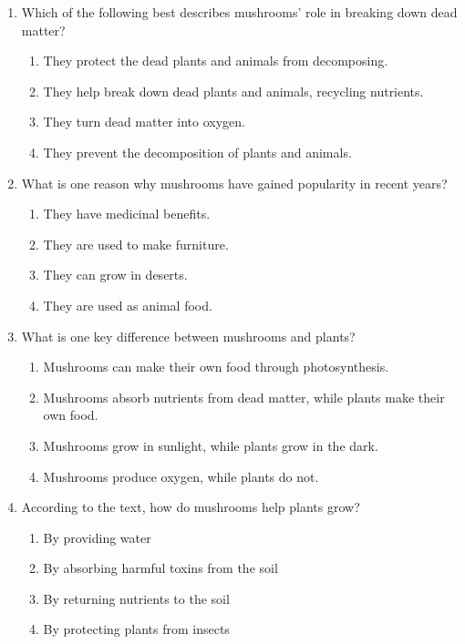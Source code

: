 \documentclass[12pt]{article}
\begin{document}
\begin{enumerate}
    \item Which of the following best describes mushrooms' role in breaking down dead matter?
    \begin{enumerate}[label=\Alph*.]
        \item They protect the dead plants and animals from decomposing.
        \item They help break down dead plants and animals, recycling nutrients.
        \item They turn dead matter into oxygen.
        \item They prevent the decomposition of plants and animals.
    \end{enumerate}
    \vspace{0.5cm}

    \item What is one reason why mushrooms have gained popularity in recent years?
    \begin{enumerate}[label=\Alph*.]
        \item They have medicinal benefits.
        \item They are used to make furniture.
        \item They can grow in deserts.
        \item They are used as animal food.
    \end{enumerate}
    \vspace{0.5cm}

    \item What is one key difference between mushrooms and plants?
    \begin{enumerate}[label=\Alph*.]
        \item Mushrooms can make their own food through photosynthesis.
        \item Mushrooms absorb nutrients from dead matter, while plants make their own food.
        \item Mushrooms grow in sunlight, while plants grow in the dark.
        \item Mushrooms produce oxygen, while plants do not.
    \end{enumerate}
    \vspace{0.5cm}

    \item According to the text, how do mushrooms help plants grow?
    \begin{enumerate}[label=\Alph*.]
        \item By providing water
        \item By absorbing harmful toxins from the soil
        \item By returning nutrients to the soil
        \item By protecting plants from insects
    \end{enumerate}

\end{enumerate}
\newpage
\end{document}
